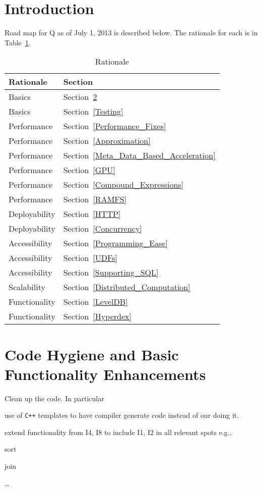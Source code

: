 \usepackage{hyperref}

\section{Introduction}
Road map for Q as of July 1, 2013 is described below. The rationale for
each is in Table~\ref{Rationale}.

\begin{table}[ht]
\centering
\begin{tabular}{|l|l|} \hline \hline 
{\bf Rationale} & {\bf Section} \\ \hline \hline 
Basics      & Section~\ref{Code_Hygiene} \\ \hline 
Basics      & Section~\ref{Testing} \\ \hline 
\hline
Performance & Section~\ref{Performance_Fixes} \\ \hline 
Performance & Section~\ref{Approximation} \\ \hline 
Performance & Section~\ref{Meta_Data_Based_Acceleration} \\ \hline 
Performance & Section~\ref{GPU} \\ \hline 
Performance & Section~\ref{Compound_Expressions} \\ \hline 
Performance & Section~\ref{RAMFS} \\ \hline 
\hline
Deployability & Section~\ref{HTTP} \\ \hline 
Deployability & Section~\ref{Concurrency} \\ \hline 
\hline
Accessibility & Section~\ref{Programming_Ease} \\ \hline 
Accessibility & Section~\ref{UDFs} \\ \hline 
Accessibility & Section~\ref{Supporting_SQL} \\ \hline 
\hline
Scalability & Section~\ref{Distributed_Computation} \\ \hline 
\hline 
Functionality & Section~\ref{LevelDB} \\ \hline 
Functionality & Section~\ref{Hyperdex} \\ \hline 
\hline
\end{tabular}
\caption{Rationale}
\label{Rationale}
\end{table}

\section{Code Hygiene and Basic Functionality Enhancements}
\label{Code_Hygiene}
Clean up the code. In particular
\be
\item use of \verb=C++= templates to have compiler generate code instead
of our doing it. 
\item extend functionality from I4, I8 to include I1, I2 in all relevant
spots e.g., 
\be
\item sort
\item join
\item \ldots
\ee

